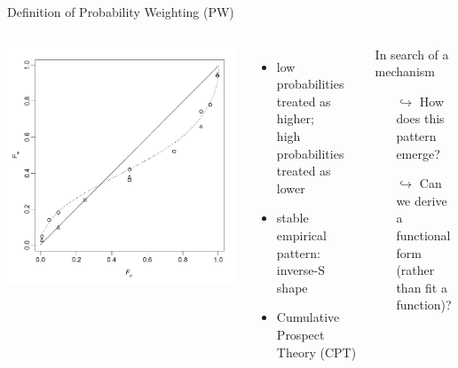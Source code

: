 \begin{frame}{Definition of Probability Weighting (PW)}

\begin{columns}%
{\centering	\includegraphics[width=.9\textwidth]{../../figs/TK1992.pdf} }
\parencite[p. 310, Fig. 1,relabelled axes]{TverskyKahneman1992}

\begin{itemize}
  \item low probabilities treated as higher;\\ 
  high probabilities treated as lower
  \item stable empirical pattern: inverse-S shape
  \item Cumulative Prospect Theory (CPT) \nocite{}
\end{itemize}
\vspace{1em}
\bi
	\item	{}
\ei
\vspace{1em}
\begin{block}{In search of a mechanism}
	\begin{itemize}
	  \item[$\hookrightarrow$] How does this pattern emerge?
  	\item[$\hookrightarrow$] Can we derive a functional form\\ 
	(rather than fit a function)?
	\end{itemize}
\end{block}

\end{columns}
\end{frame}

